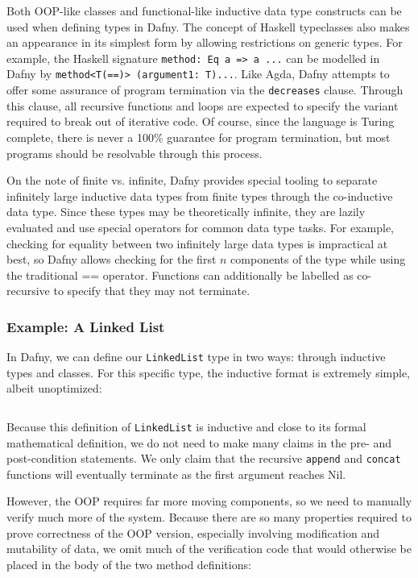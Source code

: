 \documentclass{article}
\begin{document}
Both OOP-like classes and functional-like inductive data type constructs can be used when defining types in Dafny.
The concept of Haskell typeclasses also makes an appearance in its simplest form
by allowing restrictions on generic types. For example, the Haskell signature \texttt{method: Eq a => a ...} can be modelled
in Dafny by \texttt{method<T(==)> (argument1: T)...}. Like Agda, Dafny attempts to offer some assurance
of program termination via the \texttt{decreases} clause. Through this clause, all recursive functions and loops
are expected to specify the variant required to break out of iterative code. Of course, since the language is Turing complete,
there is never a 100\% guarantee for program termination, but most programs should be resolvable through
this process.

On the note of finite vs. infinite, Dafny provides special tooling to
separate infinitely large inductive data types from finite types through
the co-inductive data type. Since these types may be theoretically infinite,
they are lazily evaluated and use special operators for common data type tasks.
For example, checking for equality between two infinitely large data types is impractical at best,
so Dafny allows checking for the first $n$ components of the type while using the traditional == operator.
Functions can additionally be labelled as co-recursive
to specify that they may not terminate.

\subsubsection{Example: A Linked List}

In Dafny, we can define our \texttt{LinkedList} type in two ways: through inductive types and classes.
For this specific type, the inductive format is extremely simple, albeit unoptimized:
\inputminted{python}{linked_list/main.dfy} %

Because this definition of \texttt{LinkedList} is inductive and close to its formal mathematical definition,
we do not need to make many claims in the pre- and post-condition statements. We only claim that
the recursive \texttt{append} and \texttt{concat} functions will eventually terminate as
the first argument reaches Nil.

However, the OOP requires far more moving components, so we need to manually verify much more of the system.
Because there are so many properties required to prove correctness of the OOP version,
especially involving modification and mutability of data,
we omit much of the verification code that would otherwise be placed in the body of the two method definitions:
\inputminted{rust}{linked_list/main_class.dfy} %
\end{document}
